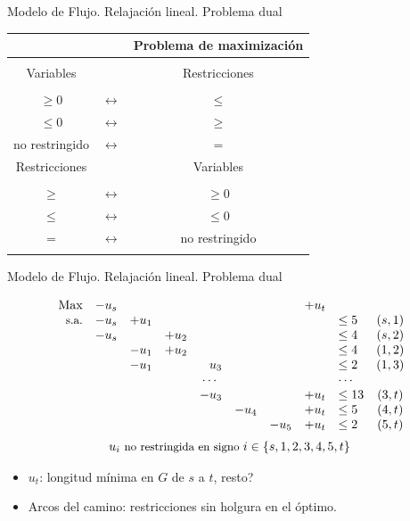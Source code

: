 \documentclass[aspectratio=169]{beamer}
\begin{document}
\begin{frame}{Modelo de Flujo. Relajación lineal. Problema dual}

\begin{center}
	{\small
		\begin{tabular}{ccc}
			\hline
			{\sc {\bf Problema de  minimización}} & & {\sc
				{\bf Problema de maximización}}
			\\
			\hline
			\\
			{ Variables} & & { Restricciones}
			\\
			\hline
			\\
			$\geq 0 $  & $\longleftrightarrow$ & $\leq$
			\\
			$\leq 0 $  & $\longleftrightarrow$ & $\geq$
			\\
			{no restringido}  & $\longleftrightarrow$ &
			$=$
			\\
			\hline
			{ Restricciones} & & { Variables}
			\\
			\hline
			\\
			$\geq$ & $\longleftrightarrow$ & $\geq 0$
			\\
			$\leq$ & $\longleftrightarrow$ & $\leq 0$
			\\
			$=$ & $\longleftrightarrow$ & { no
				restringido}
			\\
			\hline
			\\
		\end{tabular}
	}
\end{center}


\end{frame}


\begin{frame}{Modelo de Flujo. Relajación lineal. Problema dual}

$$
\begin{array}{rrrrrrrrlc}
\text{Max} & -u_s &  & & & &  & +  u_t & & 
\\
\text{\small s.a.} & -u_s & + u_1 & & & & &  & \leq 5 & (s,1)
\\
& -u_s & & + u_2 &  &  & &  & \leq 4 & (s,2)
\\
&  & -u_1  & + u_2 & & & &  & \leq 4 & (1,2)
\\
&  & -u_1  &  & u_3 &  & &  & \leq 2 & (1,3)
\\
& \multicolumn{7}{c}{\cdots} & \cdots &
\\
&  &   &  & -u_3 &  &  & +u_t & \leq 13 & (3,t)
\\
&  &   &  &  &  -u_4 &   & +u_t  & \leq 5 & (4,t)
\\
&  &   &  &    & & -u_5 & +u_t  & \leq 2 & (5,t)
\\[2mm]
& \multicolumn{8}{c}{u_i \text{ \small no restringida en signo } i\in\{s,1,2,3,4,5,t\}} 
\end{array}
$$

\begin{itemize} \itemsep 3mm
\item $u_t$: longitud mínima en $G$ de $s$ a $t$, \alert{resto?}
\item Arcos del camino: restricciones sin holgura en el óptimo.
\end{itemize}


\end{frame}
\end{document}
